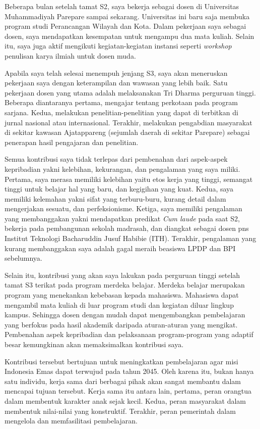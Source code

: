 \documentclass[../main.tex]{subfiles}
\begin{document}
Beberapa bulan setelah tamat S2, saya bekerja sebagai dosen di Universitas Muhammadiyah Parepare sampai sekarang.
Universitas ini baru saja membuka program studi Perancangan Wilayah dan Kota.
Dalam pekerjaan saya sebagai dosen, saya mendapatkan kesempatan untuk mengampu dua mata kuliah.
Selain itu, saya juga aktif mengikuti kegiatan-kegiatan instansi seperti \textit{workshop} penulisan karya ilmiah untuk dosen muda.

Apabila saya telah selesai menempuh jenjang S3,
saya akan meneruskan pekerjaan saya dengan keterampilan dan wawasan yang lebih baik. Satu pekerjaan dosen yang utama adalah melaksanakan Tri Dharma perguruan tinggi. Beberapa diantaranya pertama, mengajar tentang perkotaan pada program sarjana. Kedua, melakukan penelitian-penelitian yang dapat di terbitkan di jurnal nasional atau internasional. Terakhir, melakukan pengabdian masyarakat di sekitar kawasan Ajatappareng (sejumlah daerah di sekitar Parepare) sebagai penerapan hasil pengajaran dan penelitian.

Semua kontribusi saya tidak terlepas dari pembenahan dari aspek-aspek kepribadian yakni kelebihan, kekurangan, dan pengalaman yang saya miliki.
Pertama, saya merasa memiliki kelebihan yaitu etos kerja yang tinggi, semangat tinggi untuk belajar hal yang baru, dan kegigihan yang kuat. Kedua, saya memiliki kelemahan yakni sifat yang terburu-buru, kurang detail dalam mengerjakan sesuatu, dan perfeksionisme.
Ketiga, saya memiliki pengalaman yang membanggakan yakni mendapatkan predikat \textit{Cum laude} pada saat S2, bekerja pada pembangunan sekolah madrasah, dan diangkat sebagai dosen pns Institut Teknologi Bacharuddin Jusuf Habibie (ITH). Terakhir, pengalaman yang kurang membanggakan saya adalah gagal meraih beasiswa LPDP dan BPI sebelumnya.

Selain itu, kontribusi yang akan saya lakukan pada perguruan tinggi setelah tamat S3 terikat pada program merdeka belajar.
Merdeka belajar merupakan program yang menekankan kebebasan kepada mahasiswa.
Mahasiswa dapat mengambil mata kuliah di luar program studi dan kegiatan diluar lingkup kampus.
Sehingga dosen dengan mudah dapat mengembangkan pembelajaran yang berfokus pada hasil akademik daripada aturan-aturan yang mengikat. Pembenahan aspek kepribadian dan pelaksanaan program-program yang adaptif besar kemungkinan akan memaksimalkan kontribusi saya.

Kontribusi tersebut bertujuan untuk meningkatkan pembelajaran agar misi Indonesia Emas dapat terwujud pada tahun 2045. Oleh karena itu, bukan hanya satu individu, kerja sama dari berbagai pihak akan sangat membantu dalam mencapai tujuan tersebut.
Kerja sama itu antara lain, pertama, peran orangtua dalam membentuk karakter anak sejak kecil. Kedua, peran masyarakat dalam membentuk nilai-nilai yang konstruktif. Terakhir, peran pemerintah dalam mengelola dan memfasilitasi pembelajaran.
\end{document}
